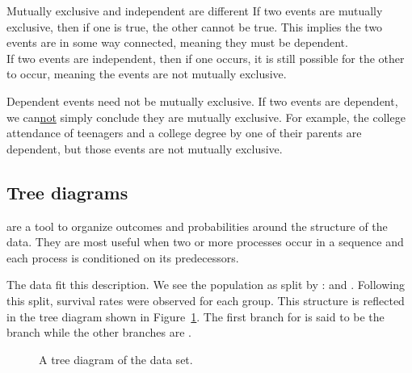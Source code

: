 \begin{onebox}{Mutually exclusive and independent are different}
If two events are mutually exclusive, then if one is true, the other cannot be true. This implies the two events are in some way connected, meaning they must be dependent.\\
If two events are independent, then if one occurs, it is still possible for the other to occur, meaning the events are not mutually exclusive.\end{onebox}

\begin{onebox}{Dependent events need not be mutually exclusive.}
{If two events are dependent, we can\underline{not} simply conclude they are mutually exclusive. For example, the college attendance of teenagers and a college degree by one of their parents are dependent, but those events are not mutually exclusive.}
\end{onebox}


\D{\newpage}

\subsection{Tree diagrams}


 are a tool to organize outcomes and probabilities around the structure of the data. They are most useful when two or more processes occur in a sequence and each process is conditioned on its predecessors.

The  data fit this description. We see the population as split by :  and . Following this split, survival rates were observed for each group. This structure is reflected in the tree diagram shown in Figure~\ref{smallpoxTreeDiagram}. The first branch for  is said to be the  branch while the other branches are .

\begin{figure}[ht]
\centering
{}
\caption{A tree diagram of the  data set.}
\label{smallpoxTreeDiagram}
\end{figure}

